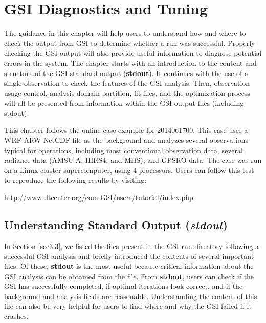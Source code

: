 \chapter{GSI Diagnostics and Tuning}
\setlength{\parskip}{12pt}

The guidance in this chapter will help users to understand how and where to check the output from GSI to determine whether a run was successful. Properly checking the GSI output will also provide useful information to diagnose potential errors in the system. The chapter starts with an introduction to the content and structure of the GSI standard output (\textbf{stdout}). It continues with the use of a single observation to check the features of the GSI analysis. Then, observation usage control, analysis domain partition, fit files, and the optimization process will all be presented from information within the GSI output files (including stdout).

This chapter follows the online case example for 2014061700. This case uses a WRF-ARW NetCDF file as the background and analyzes several observations typical for operations, including most conventional observation data, several radiance data (AMSU-A, HIRS4, and MHS), and GPSRO data. The case was run on a Linux cluster supercomputer, using 4 processors. Users can follow this test to reproduce the following results by visiting: 

\begin{center}
\url{http://www.dtcenter.org/com-GSI/users/tutorial/index.php}
\end{center}

\section{Understanding Standard Output (\textit{stdout})}
\label{sec4.1}

In Section \ref{sec3.3}, we listed the files present in the GSI run directory following a successful GSI analysis and briefly introduced the contents of several important files. Of these, \textbf{stdout} is the most useful because critical information about the GSI analysis can be obtained from the file. From \textbf{stdout}, users can check if the GSI has successfully completed, if optimal iterations look correct, and if the background and analysis fields are reasonable. Understanding the content of this file can also be very helpful for users to find where and why the GSI failed if it crashes. 

